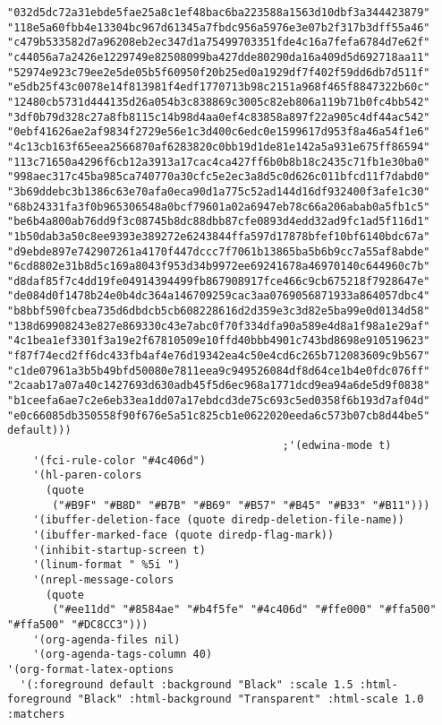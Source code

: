\documentclass[11pt]{article}
\begin{document}
\begin{verbatim}
"032d5dc72a31ebde5fae25a8c1ef48bac6ba223588a1563d10dbf3a344423879" "118e5a60fbb4e13304bc967d61345a7fbdc956a5976e3e07b2f317b3dff55a46" "c479b533582d7a96208eb2ec347d1a75499703351fde4c16a7fefa6784d7e62f" "c44056a7a2426e1229749e82508099ba427dde80290da16a409d5d692718aa11" "52974e923c79ee2e5de05b5f60950f20b25ed0a1929df7f402f59dd6db7d511f" "e5db25f43c0078e14f813981f4edf1770713b98c2151a968f465f8847322b60c" "12480cb5731d444135d26a054b3c838869c3005c82eb806a119b71b0fc4bb542" "3df0b79d328c27a8fb8115c14b98d4aa0ef4c83858a897f22a905c4df44ac542" "0ebf41626ae2af9834f2729e56e1c3d400c6edc0e1599617d953f8a46a54f1e6" "4c13cb163f65eea2566870af6283820c0bb19d1de81e142a5a931e675ff86594" "113c71650a4296f6cb12a3913a17cac4ca427ff6b0b8b18c2435c71fb1e30ba0" "998aec317c45ba985ca740770a30cfc5e2ec3a8d5c0d626c011bfcd11f7dabd0" "3b69ddebc3b1386c63e70afa0eca90d1a775c52ad144d16df932400f3afe1c30" "68b24331fa3f0b965306548a0bcf79601a02a6947eb78c66a206abab0a5fb1c5" "be6b4a800ab76dd9f3c08745b8dc88dbb87cfe0893d4edd32ad9fc1ad5f116d1" "1b50dab3a50c8ee9393e389272e6243844ffa597d17878bfef10bf6140bdc67a" "d9ebde897e742907261a4170f447dccc7f7061b13865ba5b6b9cc7a55af8abde" "6cd8802e31b8d5c169a8043f953d34b9972ee69241678a46970140c644960c7b" "d8daf85f7c4dd19fe04914394499fb867908917fce466c9cb675218f7928647e" "de084d0f1478b24e0b4dc364a146709259cac3aa0769056871933a864057dbc4" "b8bbf590fcbea735d6dbdcb5cb608228616d2d359e3c3d82e5ba99e0d0134d58" "138d69908243e827e869330c43e7abc0f70f334dfa90a589e4d8a1f98a1e29af" "4c1bea1ef3301f3a19e2f67810509e10ffd40bbb4901c743bd8698e910519623" "f87f74ecd2ff6dc433fb4af4e76d19342ea4c50e4cd6c265b712083609c9b567" "c1de07961a3b5b49bfd50080e7811eea9c949526084df8d64ce1b4e0fdc076ff" "2caab17a07a40c1427693d630adb45f5d6ec968a1771dcd9ea94a6de5d9f0838" "b1ceefa6ae7c2e6eb33ea1dd07a17ebdcd3de75c693c5ed0358f6b193d7af04d" "e0c66085db350558f90f676e5a51c825cb1e0622020eeda6c573b07cb8d44be5" default)))
                                           ;'(edwina-mode t)
    '(fci-rule-color "#4c406d")
    '(hl-paren-colors
      (quote
       ("#B9F" "#B8D" "#B7B" "#B69" "#B57" "#B45" "#B33" "#B11")))
    '(ibuffer-deletion-face (quote diredp-deletion-file-name))
    '(ibuffer-marked-face (quote diredp-flag-mark))
    '(inhibit-startup-screen t)
    '(linum-format " %5i ")
    '(nrepl-message-colors
      (quote
       ("#ee11dd" "#8584ae" "#b4f5fe" "#4c406d" "#ffe000" "#ffa500" "#ffa500" "#DC8CC3")))
    '(org-agenda-files nil)
    '(org-agenda-tags-column 40)
'(org-format-latex-options
  '(:foreground default :background "Black" :scale 1.5 :html-foreground "Black" :html-background "Transparent" :html-scale 1.0 :matchers

\end{verbatim}
\end{document}
